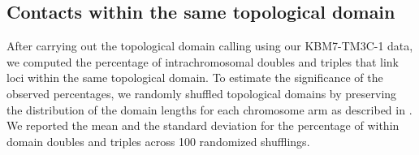 \subsection{Contacts within the same topological domain}
After carrying out the topological domain calling using our KBM7-TM3C-1 data,
we computed the percentage of intrachromosomal doubles and triples that
link loci within the same topological domain.
To estimate the significance of the observed percentages, we randomly
shuffled topological domains by preserving the distribution of
the domain lengths for each chromosome arm as described in
 \citet{ay:statistical}. We reported the mean and the standard deviation
for the percentage of within domain doubles and triples across 100
randomized shufflings.


%


